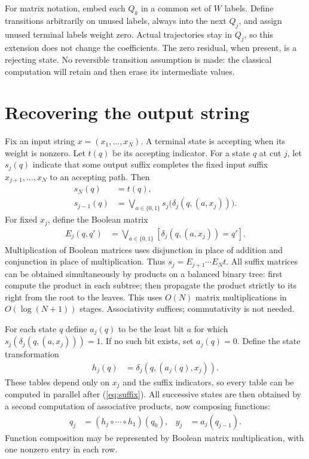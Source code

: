 \documentclass[11pt]{article}
\begin{document}
For matrix notation, embed each $Q_k$ in a common set of $W$ labels.
Define transitions arbitrarily on unused labels, always into the next
$Q_j$, and assign unused terminal labels weight zero. Actual trajectories
stay in $Q_j$, so this extension does not change the coefficients.
The zero residual, when present, is a rejecting state. No reversible
transition assumption is made: the classical computation will retain and
then erase its intermediate values.

\section{Recovering the output string}

Fix an input string $x=(x_1,\ldots,x_N)$. A terminal state is accepting
when its weight is nonzero. Let $t(q)$ be its accepting indicator.
For a state $q$ at cut $j$, let $s_j(q)$ indicate that some output suffix
completes the fixed input suffix $x_{j+1},\ldots,x_N$ to an accepting path.
Then
\begin{align}
 s_N(q)&=t(q),\\
 s_{j-1}(q)&=\bigvee_{a\in\{0,1\}}
       s_j\bigl(\delta_j(q,(a,x_j))\bigr).
 \label{eq:suffix}
\end{align}
For fixed $x_j$, define the Boolean matrix
\begin{align}
 E_j(q,q')&=\bigvee_{a\in\{0,1\}}
       [\delta_j(q,(a,x_j))=q'].
 \label{eq:relation}
\end{align}
Multiplication of Boolean matrices uses disjunction in place of addition
and conjunction in place of multiplication. Thus
$s_j=E_{j+1}\cdots E_Nt$.
All suffix matrices can be obtained simultaneously by products on a
balanced binary tree: first compute the product in each subtree; then
propagate the product strictly to its right from the root to the leaves.
This uses $O(N)$ matrix multiplications in $O(\log(N+1))$ stages.
Associativity suffices; commutativity is not needed.

For each state $q$ define $a_j(q)$ to be the least bit $a$ for which
$s_j(\delta_j(q,(a,x_j)))=1$. If no such bit exists, set $a_j(q)=0$.
Define the state transformation
\begin{align}
 h_j(q)&=\delta_j(q,(a_j(q),x_j)).
 \label{eq:greedy}
\end{align}
These tables depend only on $x_j$ and the suffix indicators, so every table
can be computed in parallel after (\ref{eq:suffix}).
All successive states are then obtained by a second computation of
associative products, now composing functions:
\begin{align}
 q_j&=(h_j\circ\cdots\circ h_1)(q_0),&
 y_j&=a_j(q_{j-1}).
 \label{eq:output}
\end{align}
Function composition may be represented by Boolean matrix multiplication,
with one nonzero entry in each row.
\end{document}
